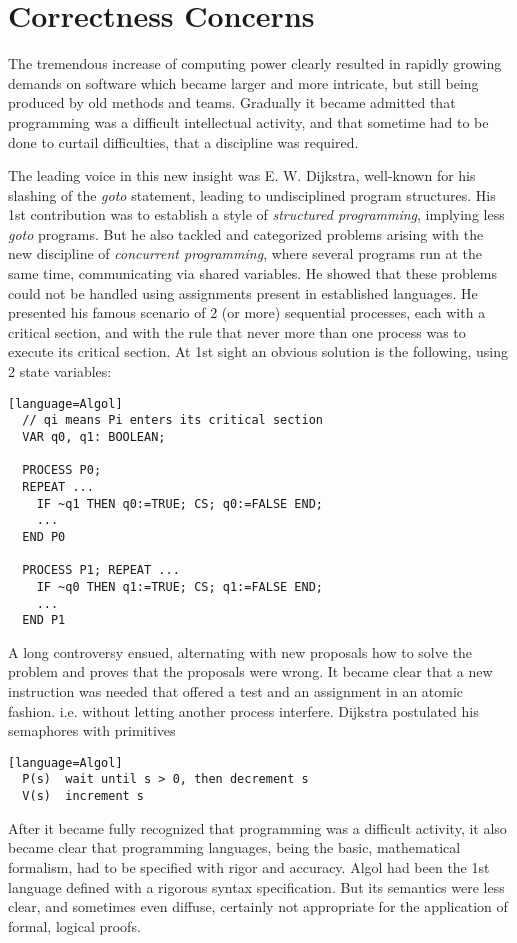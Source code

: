 \section{Correctness Concerns}
The tremendous increase of computing power clearly resulted in rapidly growing
demands on software which became larger and more intricate, but still being
produced by old methods and teams. Gradually it became admitted that programming
was a difficult intellectual activity, and that sometime had to be done to
curtail difficulties, that a discipline was required.

The leading voice in this new insight was E. W. Dijkstra, well-known for his
slashing of the \emph{goto} statement, leading to undisciplined program structures.
His 1st contribution was to establish a style of \emph{structured programming},
implying less \emph{goto} programs. But he also tackled and categorized problems
arising with the new discipline of \emph{concurrent programming}, where several
programs run at the same time, communicating via shared variables. He showed that
these problems could not be handled using assignments present in established
languages. He presented his famous scenario of 2 (or more) sequential processes,
each with a critical section, and with the rule that never more than one process
was to execute its critical section. At 1st sight an obvious solution is the
following, using 2 state variables:
\begin{verbatim}[language=Algol]
  // qi means Pi enters its critical section
  VAR q0, q1: BOOLEAN;

  PROCESS P0;
  REPEAT ...
    IF ~q1 THEN q0:=TRUE; CS; q0:=FALSE END;
    ...
  END P0

  PROCESS P1; REPEAT ...
    IF ~q0 THEN q1:=TRUE; CS; q1:=FALSE END;
    ...
  END P1
\end{verbatim}

A long controversy ensued, alternating with new proposals how to solve the
problem and proves that the proposals were wrong. It became clear that a new
instruction was needed that offered a test and an assignment in an atomic fashion.
i.e. without letting another process interfere. Dijkstra postulated his
semaphores with primitives
\begin{verbatim}[language=Algol]
  P(s)  wait until s > 0, then decrement s
  V(s)  increment s
\end{verbatim}

After it became fully recognized that programming was a difficult activity, it
also became clear that programming languages, being the basic, mathematical
formalism, had to be specified with rigor and accuracy. Algol had been the 1st
language defined with a rigorous syntax specification. But its semantics were
less clear, and sometimes even diffuse, certainly not appropriate for the
application of formal, logical proofs.

